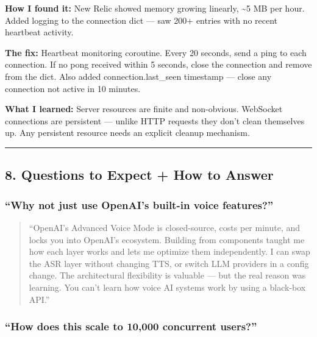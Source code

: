 \documentclass[
  11pt,
]{article}
\begin{document}
\textbf{How I found it:} New Relic showed memory growing linearly,
\textasciitilde5 MB per hour. Added logging to the connection dict ---
saw 200+ entries with no recent heartbeat activity.

\textbf{The fix:} Heartbeat monitoring coroutine. Every 20 seconds, send
a ping to each connection. If no pong received within 5 seconds, close
the connection and remove from the dict. Also added
connection.last\_seen timestamp --- close any connection not active in
10 minutes.

\textbf{What I learned:} Server resources are finite and non-obvious.
WebSocket connections are persistent --- unlike HTTP requests they don't
clean themselves up. Any persistent resource needs an explicit cleanup
mechanism.

\begin{center}\rule{0.5\linewidth}{0.5pt}\end{center}

\hypertarget{questions-to-expect-how-to-answer}{%
\subsection{8. Questions to Expect + How to
Answer}\label{questions-to-expect-how-to-answer}}

\hypertarget{why-not-just-use-openais-built-in-voice-features}{%
\subsubsection{``Why not just use OpenAI's built-in voice
features?''}\label{why-not-just-use-openais-built-in-voice-features}}

\begin{quote}
``OpenAI's Advanced Voice Mode is closed-source, costs per minute, and
locks you into OpenAI's ecosystem. Building from components taught me
how each layer works and lets me optimize them independently. I can swap
the ASR layer without changing TTS, or switch LLM providers in a config
change. The architectural flexibility is valuable --- but the real
reason was learning. You can't learn how voice AI systems work by using
a black-box API.''
\end{quote}

\hypertarget{how-does-this-scale-to-10000-concurrent-users}{%
\subsubsection{``How does this scale to 10,000 concurrent
users?''}\label{how-does-this-scale-to-10000-concurrent-users}}
\end{document}
